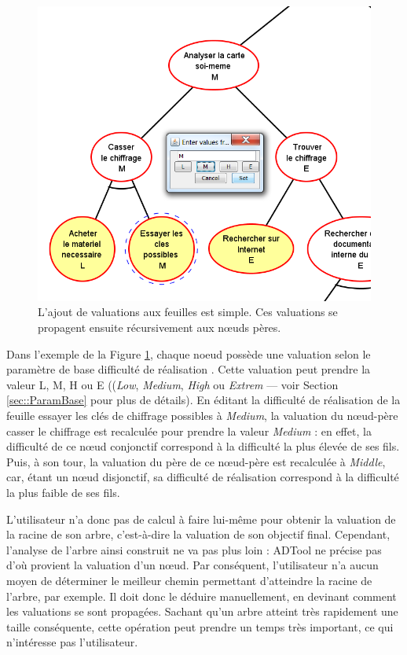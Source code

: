 	\begin{figure}[h]
            \centering
            \includegraphics[width=1\textwidth]{figure/adtool_add_values.png}
            \caption{L'ajout de valuations aux feuilles est simple. Ces valuations se propagent ensuite récursivement aux nœuds pères.}
            \label{fig:arbre_exemple_1}
    \end{figure}
	
	Dans l'exemple de la {\sc Figure} \ref{fig:arbre_exemple_1}, chaque noeud possède une valuation selon le paramètre de base \og difficulté de réalisation \fg{}. Cette valuation peut prendre la valeur L, M, H ou E ((\emph{Low}, \emph{Medium}, \emph{High} ou \emph{Extrem} --- voir Section \ref{sec::ParamBase} pour plus de détails). En éditant la difficulté de réalisation de la feuille \og essayer les clés de chiffrage possibles \fg{}  à \emph{Medium}, la valuation du nœud-père \og casser le chiffrage \fg{} est recalculée pour prendre la valeur \emph{Medium} : en effet, la difficulté de ce nœud conjonctif correspond à la difficulté la plus élevée de ses fils. Puis, à son tour, la valuation du père de ce nœud-père est recalculée à \emph{Middle}, car, étant un nœud disjonctif, sa difficulté de réalisation correspond à la difficulté la plus faible de ses fils.
	
	L'utilisateur n'a donc pas de calcul à faire lui-même pour obtenir la valuation de la racine de son arbre, c'est-à-dire la valuation de son objectif final. Cependant, l'analyse de l'arbre ainsi construit ne va pas plus loin : ADTool ne précise pas d'où provient la valuation d'un nœud. Par conséquent, l'utilisateur n'a aucun moyen de déterminer le \og meilleur chemin \fg{} permettant d'atteindre la racine de l'arbre, par exemple. Il doit donc le déduire manuellement, en devinant comment les valuations se sont propagées. Sachant qu'un arbre atteint très rapidement une taille conséquente, cette opération peut prendre un temps très important, ce qui n'intéresse pas l'utilisateur.
	
